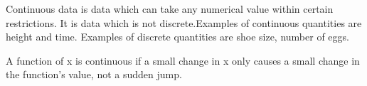 Continuous data is data which can take any numerical
value within certain restrictions. It is data which is
not discrete.Examples of continuous quantities are height and time.
Examples of discrete quantities are shoe size, number of
eggs. 
\par
A function of x is continuous if a small change in x
only causes a small change in the function's
value, not a sudden jump.